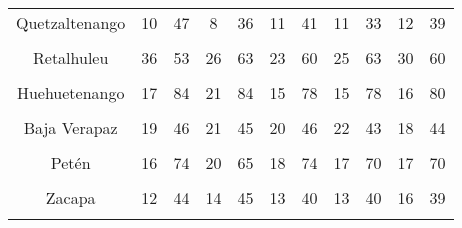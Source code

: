 {\begin{tabular}[t]{ccccccccccc}
Quetzaltenango & 10 & 47 & 8 & 36 & 11 & 41 & 11 & 33 & 12 & 39\\
\cellcolor[HTML]{B6B3FF}{Suchitepéquez} & \cellcolor[HTML]{B6B3FF}{36} & \cellcolor[HTML]{B6B3FF}{78} & \cellcolor[HTML]{B6B3FF}{26} & \cellcolor[HTML]{B6B3FF}{73} & \cellcolor[HTML]{B6B3FF}{33} & \cellcolor[HTML]{B6B3FF}{89} & \cellcolor[HTML]{B6B3FF}{30} & \cellcolor[HTML]{B6B3FF}{65} & \cellcolor[HTML]{B6B3FF}{29} & \cellcolor[HTML]{B6B3FF}{74}\\
Retalhuleu & 36 & 53 & 26 & 63 & 23 & 60 & 25 & 63 & 30 & 60\\
\cellcolor[HTML]{B6B3FF}{San Marcos} & \cellcolor[HTML]{B6B3FF}{13} & \cellcolor[HTML]{B6B3FF}{68} & \cellcolor[HTML]{B6B3FF}{9} & \cellcolor[HTML]{B6B3FF}{71} & \cellcolor[HTML]{B6B3FF}{9} & \cellcolor[HTML]{B6B3FF}{69} & \cellcolor[HTML]{B6B3FF}{7} & \cellcolor[HTML]{B6B3FF}{65} & \cellcolor[HTML]{B6B3FF}{7} & \cellcolor[HTML]{B6B3FF}{71}\\
Huehuetenango & 17 & 84 & 21 & 84 & 15 & 78 & 15 & 78 & 16 & 80\\
\cellcolor[HTML]{B6B3FF}{Quiché} & \cellcolor[HTML]{B6B3FF}{20} & \cellcolor[HTML]{B6B3FF}{63} & \cellcolor[HTML]{B6B3FF}{17} & \cellcolor[HTML]{B6B3FF}{61} & \cellcolor[HTML]{B6B3FF}{15} & \cellcolor[HTML]{B6B3FF}{63} & \cellcolor[HTML]{B6B3FF}{11} & \cellcolor[HTML]{B6B3FF}{68} & \cellcolor[HTML]{B6B3FF}{13} & \cellcolor[HTML]{B6B3FF}{61}\\
Baja Verapaz & 19 & 46 & 21 & 45 & 20 & 46 & 22 & 43 & 18 & 44\\
\cellcolor[HTML]{B6B3FF}{Alta Verapaz} & \cellcolor[HTML]{B6B3FF}{19} & \cellcolor[HTML]{B6B3FF}{55} & \cellcolor[HTML]{B6B3FF}{15} & \cellcolor[HTML]{B6B3FF}{57} & \cellcolor[HTML]{B6B3FF}{14} & \cellcolor[HTML]{B6B3FF}{57} & \cellcolor[HTML]{B6B3FF}{14} & \cellcolor[HTML]{B6B3FF}{57} & \cellcolor[HTML]{B6B3FF}{11} & \cellcolor[HTML]{B6B3FF}{53}\\
Petén & 16 & 74 & 20 & 65 & 18 & 74 & 17 & 70 & 17 & 70\\
\cellcolor[HTML]{B6B3FF}{Izabal} & \cellcolor[HTML]{B6B3FF}{18} & \cellcolor[HTML]{B6B3FF}{36} & \cellcolor[HTML]{B6B3FF}{19} & \cellcolor[HTML]{B6B3FF}{39} & \cellcolor[HTML]{B6B3FF}{16} & \cellcolor[HTML]{B6B3FF}{39} & \cellcolor[HTML]{B6B3FF}{20} & \cellcolor[HTML]{B6B3FF}{33} & \cellcolor[HTML]{B6B3FF}{15} & \cellcolor[HTML]{B6B3FF}{38}\\
Zacapa & 12 & 44 & 14 & 45 & 13 & 40 & 13 & 40 & 16 & 39\\
\cellcolor[HTML]{B6B3FF}{Chiquimula} & \cellcolor[HTML]{B6B3FF}{17} & \cellcolor[HTML]{B6B3FF}{42} & \cellcolor[HTML]{B6B3FF}{17} & \cellcolor[HTML]{B6B3FF}{37} & \cellcolor[HTML]{B6B3FF}{16} & \cellcolor[HTML]{B6B3FF}{36} & \cellcolor[HTML]{B6B3FF}{13} & \cellcolor[HTML]{B6B3FF}{42} & \cellcolor[HTML]{B6B3FF}{13} & \cellcolor[HTML]{B6B3FF}{42}\\

\end{tabular}}
